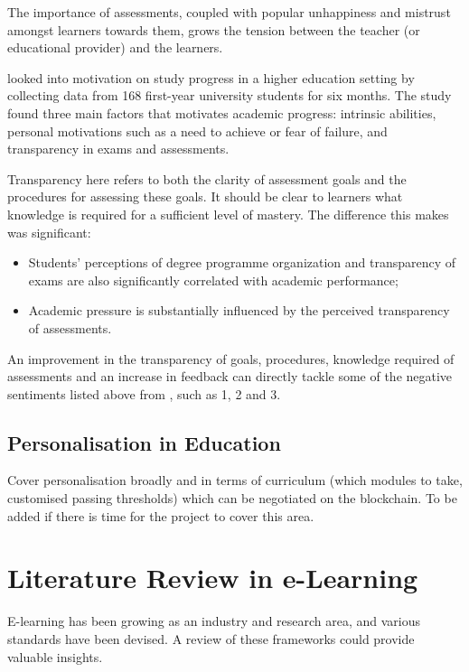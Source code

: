 The importance of assessments, coupled with popular unhappiness and mistrust amongst learners towards 
them, grows the tension between the teacher (or educational provider) and the learners.

\citet{suhre2013determinants} looked into motivation on study progress in a higher education setting by collecting data 
from 168 first-year university students for six months. The study found three main factors that motivates academic 
progress: intrinsic abilities, personal motivations such as a need to achieve or fear of failure, and transparency in 
exams and assessments.

Transparency here refers to both the clarity of assessment goals and the procedures for assessing these goals. 
It should be clear to learners what knowledge is required for a sufficient level of mastery. \citep{suhre2013determinants}
The difference this makes was significant:

\begin{itemize}
  \item Students' perceptions of degree programme organization and transparency of exams are also 
  significantly correlated with academic performance;
  \item Academic pressure is substantially influenced by the perceived transparency of assessments.
\end{itemize}

An improvement in the transparency of goals, procedures, knowledge required of assessments and an increase 
in feedback can directly tackle some of the negative sentiments listed above from \citet{brown1999assessment}, 
such as 1, 2 and 3.

\subsection{Personalisation in Education}

Cover personalisation broadly and in terms of curriculum (which modules to take, 
customised passing thresholds) which can be negotiated on the blockchain.
To be added if there is time for the project to cover this area.

\section{Literature Review in e-Learning}

E-learning has been growing as an industry and research area, and various standards have been devised. 
A review of these frameworks could provide valuable insights.

